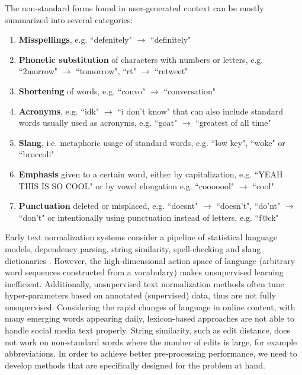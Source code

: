 \documentclass[letterpaper]{article} \usepackage{aaai19}  \usepackage{times}  \usepackage{helvet} \usepackage{courier}  \usepackage[hyphens]{url}  \usepackage{graphicx} \urlstyle{rm} \def\UrlFont{\rm}  \usepackage{graphicx}  \frenchspacing  \setlength{\pdfpagewidth}{8.5in}  \setlength{\pdfpageheight}{11in}
\newcommand{\citep}{\cite}
\begin{document}
The non-standard forms found in user-generated context can be mostly summarized into several categories:
\begin{enumerate}
    \item \textbf{Misspellings}, e.g. ``defenitely" $\rightarrow$ ``definitely"
    \item \textbf{Phonetic substitution} of characters with numbers or letters, e.g. ``2morrow" $\rightarrow$ ``tomorrow", ``rt" $\rightarrow$ ``retweet"
    \item \textbf{Shortening} of words, e.g. ``convo" $\rightarrow$ ``conversation" 
    \item \textbf{Acronyms}, e.g. ``idk" $\rightarrow$ ``i don't know" that can also include standard words usually used as acronyms, e.g. ``goat" $\rightarrow$ ``greatest of all time"
    \item \textbf{Slang}, i.e. metaphoric usage of standard words, e.g. ``low key", ``woke" or ``broccoli" 
    \item \textbf{Emphasis} given to a certain word, either by capitalization, e.g. ``YEAH THIS IS SO COOL" or by vowel elongation e.g. ``cooooool"  $\rightarrow$ ``cool"
    \item \textbf{Punctuation} deleted or misplaced, e.g. ``doesnt"  $\rightarrow$ ``doesn't", ``do'nt"  $\rightarrow$ ``don't" or intentionally using punctuation instead of letters, e.g. ``f@ck"
\end{enumerate}


Early text normalization systems consider a pipeline of statistical language models, dependency parsing, string similarity, spell-checking and slang dictionaries \citep{liu2011insertion2011a,han2011lexical,han2013lexical}. However, the high-dimensional action space of language (arbitrary word sequences constructed from a vocabulary) makes unsupervised learning inefficient. 
Additionally, unsupervised text normalization methods often tune hyper-parameters based on annotated (supervised) data, thus are not fully unsupervised.
Considering the rapid changes of language in online content, with many emerging words appearing daily, lexicon-based approaches are not able to handle social media text properly. String similarity, such as edit distance, does not work on non-standard words where the number of edits is large, for example abbreviations. In order to achieve better pre-processing performance, we need to develop methods that are specifically designed for the problem at hand. 
\end{document}
